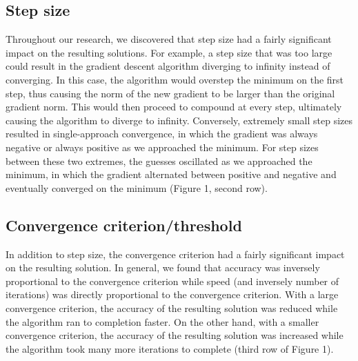 \documentclass{article}
\begin{document}
\subsection{Step size}
Throughout our research, we discovered that step size had a fairly significant impact on the resulting solutions. For example, a step size that was too large could result in the gradient descent algorithm diverging to infinity instead of converging. In this case, the algorithm would overstep the minimum on the first step, thus causing the norm of the new gradient to be larger than the original gradient norm. This would then proceed to compound at every step, ultimately causing the algorithm to diverge to infinity. Conversely, extremely small step sizes resulted in single-approach convergence, in which the gradient was always negative or always positive as we approached the minimum. For step sizes between these two extremes, the guesses oscillated as we approached the minimum, in which the gradient alternated between positive and negative and eventually converged on the minimum (Figure 1, second row).

\subsection{Convergence criterion/threshold}
In addition to step size, the convergence criterion had a fairly significant impact on the resulting solution. In general, we found that accuracy was inversely proportional to the convergence criterion while speed (and inversely number of iterations) was directly proportional to the convergence criterion. With a large convergence criterion, the accuracy of the resulting solution was reduced while the algorithm ran to completion faster. On the other hand, with a smaller convergence criterion, the accuracy of the resulting solution was increased while the algorithm took many more iterations to complete (third row of Figure 1).
\end{document}
